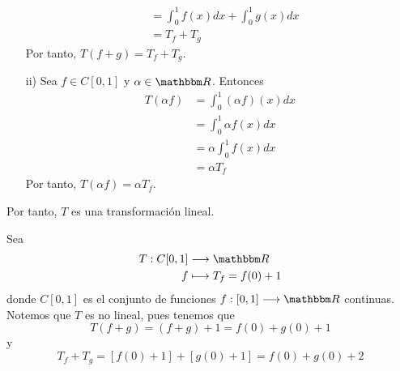 \begin{example}
\begin{enumerate}[label=\roman*)]
\begin{align*}
            & = \int_0^1 f(x) dx + \int_0^1 g(x) dx \\
            & = T_{f} + T_{g}
        \end{align*}
        Por tanto, $T(f + g) = T_{f} + T_{g}$.
        \item[ii)] Sea $f \in C[0,  1]$ y $\alpha \in \RR$. Entonces
        \begin{align*}
            T(\alpha f) & = \int_0^1 (\alpha f)(x) dx \\
            & = \int_0^1 \alpha f(x) dx \\
            & = \alpha \int_0^1 f(x) dx \\
            & = \alpha T_{f}
        \end{align*}
        Por tanto, $T(\alpha f) = \alpha T_{f}$.
    \end{enumerate}
    Por tanto, $T$ es una transformación lineal.
\end{example}

\begin{example}
    Sea
    \begin{align*}
        T:C[0,  1] & \longrightarrow \RR \\
        f & \longmapsto T_{f} = f(0) + 1
    \end{align*}
    donde $C[0,  1]$ es el conjunto de funciones $f:[0,  1] \longrightarrow \RR$ continuas. Notemos que $T$ es no lineal, pues tenemos que
    $$T(f + g) = (f + g) + 1 = f(0) + g(0) + 1$$
    y
    $$T_{f} + T_{g} = [f(0) + 1] + [g(0) + 1] = f(0) + g(0) + 2$$
\end{example}

